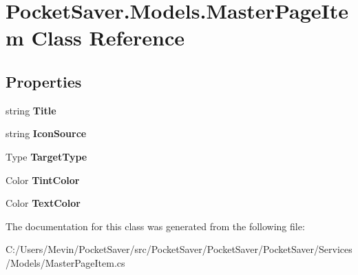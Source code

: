 \hypertarget{class_pocket_saver_1_1_models_1_1_master_page_item}{}\section{Pocket\+Saver.\+Models.\+Master\+Page\+Item Class Reference}
\label{class_pocket_saver_1_1_models_1_1_master_page_item}
\subsection*{Properties}
\begin{DoxyCompactItemize}
\item 
\mbox{\label{class_pocket_saver_1_1_models_1_1_master_page_item_a7c4154175a757c8f49d03383ea4ada42}} 
string {\bfseries Title}
\item 
\mbox{\label{class_pocket_saver_1_1_models_1_1_master_page_item_ae0a4719e8a071c3bcdee7779f8b9a06c}} 
string {\bfseries Icon\+Source}
\item 
\mbox{\label{class_pocket_saver_1_1_models_1_1_master_page_item_a9b4bfe18eed3308bc5746f466fee3138}} 
Type {\bfseries Target\+Type}
\item 
\mbox{\label{class_pocket_saver_1_1_models_1_1_master_page_item_a704c85abfb9f9dca31506e8109a7c560}} 
Color {\bfseries Tint\+Color}
\item 
\mbox{\label{class_pocket_saver_1_1_models_1_1_master_page_item_a49ed7484c31708efa54d6309096d4e8b}} 
Color {\bfseries Text\+Color}
\end{DoxyCompactItemize}


The documentation for this class was generated from the following file\+:\begin{DoxyCompactItemize}
\item 
C\+:/\+Users/\+Mevin/\+Pocket\+Saver/src/\+Pocket\+Saver/\+Pocket\+Saver/\+Pocket\+Saver/\+Services/\+Models/Master\+Page\+Item.\+cs\end{DoxyCompactItemize}
